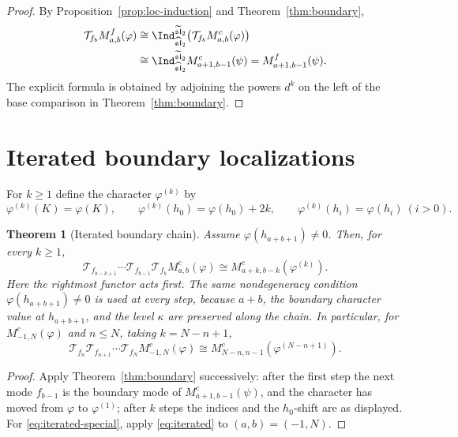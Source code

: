 \documentclass[11pt,a4paper]{article}
\newcommand{\slh}{\widehat{\mathfrak{sl}}_2}
\newcommand{\slt}{\widetilde{\mathfrak{sl}}_2}
\newcommand{\T}{\mathcal T}
\theoremstyle{plainupright}
\newtheorem{theorem}[proposition]{Theorem}
\begin{document}
\begin{proof}
By Proposition~\ref{prop:loc-induction} and Theorem~\ref{thm:boundary},
\begin{align*}
\T_{f_b}M^f_{a,b}(\varphi)
&\cong\Ind_{\slh}^{\slt}\bigl(\T_{f_b}M^c_{a,b}(\varphi)\bigr)\\
&\cong\Ind_{\slh}^{\slt}M^c_{a+1,b-1}(\psi)
=M^f_{a+1,b-1}(\psi).
\end{align*}
The explicit formula is obtained by adjoining the powers \(d^k\) on the left
of the base comparison in Theorem~\ref{thm:boundary}.
\end{proof}

\section{Iterated boundary localizations}\label{sec:iterated}

For \(k\ge1\) define the character \(\varphi^{(k)}\) by
\[
\varphi^{(k)}(K)=\varphi(K),\qquad
\varphi^{(k)}(h_0)=\varphi(h_0)+2k,\qquad
\varphi^{(k)}(h_i)=\varphi(h_i)\ (i>0).
\]

\begin{theorem}[Iterated boundary chain]\label{thm:iterated}
Assume \(\varphi(h_{a+b+1})\ne0\). Then, for every \(k\ge1\),
\begin{equation}\label{eq:iterated}
\boxed{\ \T_{f_{b-k+1}}\cdots\T_{f_{b-1}}\T_{f_b}
M^c_{a,b}(\varphi)\cong M^c_{a+k,b-k}(\varphi^{(k)}).\ }
\end{equation}
Here the rightmost functor acts first. The same nondegeneracy condition
\(\varphi(h_{a+b+1})\ne0\) is used at every step, because \(a+b\), the
boundary character value at \(h_{a+b+1}\), and the level \(\kappa\) are
preserved along the chain. In particular, for \(M^c_{-1,N}(\varphi)\) and
\(n\le N\), taking \(k=N-n+1\),
\begin{equation}\label{eq:iterated-special}
\boxed{\ \T_{f_n}\T_{f_{n+1}}\cdots\T_{f_N}
M^c_{-1,N}(\varphi)\cong M^c_{N-n,n-1}(\varphi^{(N-n+1)}).\ }
\end{equation}
\end{theorem}

\begin{proof}
Apply Theorem~\ref{thm:boundary} successively: after the first step the next
mode \(f_{b-1}\) is the boundary mode of \(M^c_{a+1,b-1}(\psi)\), and the
character has moved from \(\varphi\) to \(\varphi^{(1)}\); after \(k\) steps
the indices and the \(h_0\)-shift are as displayed. For
\eqref{eq:iterated-special}, apply \eqref{eq:iterated} to
\((a,b)=(-1,N)\).
\end{proof}
\end{document}
